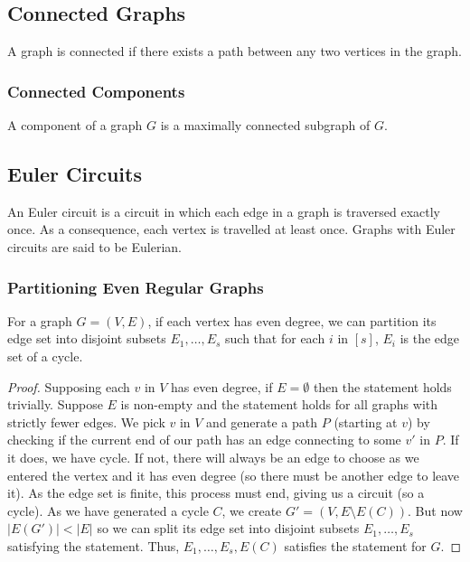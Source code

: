 \subsection{Connected Graphs}

A graph is connected if there exists a path between any two vertices 
in the graph.

\subsubsection{Connected Components}

A component of a graph $G$ is a maximally connected subgraph of $G$.

\subsection{Euler Circuits}

An Euler circuit is a circuit in which each edge in a graph is
traversed exactly once. As a consequence, each vertex is travelled 
at least once. Graphs with Euler circuits are said to be Eulerian.

\newpage

\subsubsection{Partitioning Even Regular Graphs} \label{eulerpart}

For a graph $G = (V, E)$, if each vertex has even degree, we can
partition its edge set into disjoint subsets $E_1, \ldots, E_s$
such that for each $i$ in $[s]$, $E_i$ is the edge set of a cycle.
\begin{proof}
    Supposing each $v$ in $V$ has even degree, if $E = \emptyset$ then
    the statement holds trivially. Suppose $E$ is non-empty and the
    statement holds for all graphs with strictly fewer edges. We
    pick $v$ in $V$ and generate a path $P$ (starting at $v$) 
    by checking if the current end of our path has an edge connecting 
    to some $v'$ in $P$. If it does, we have cycle. If not, there will 
    always be an edge to choose as we entered the vertex and it has even degree 
    (so there must be another edge to leave it). As the edge set is finite,
    this process must end, giving us a circuit (so a cycle). As we
    have generated a cycle $C$, we create $G' = (V, E \setminus E(C))$. 
    But now $|E(G')| < |E|$ so we can split its edge set into
    disjoint subsets $E_1, \ldots, E_s$ satisfying the statement.
    Thus, $E_1, \ldots, E_s, E(C)$ satisfies the statement for $G$.
\end{proof}

